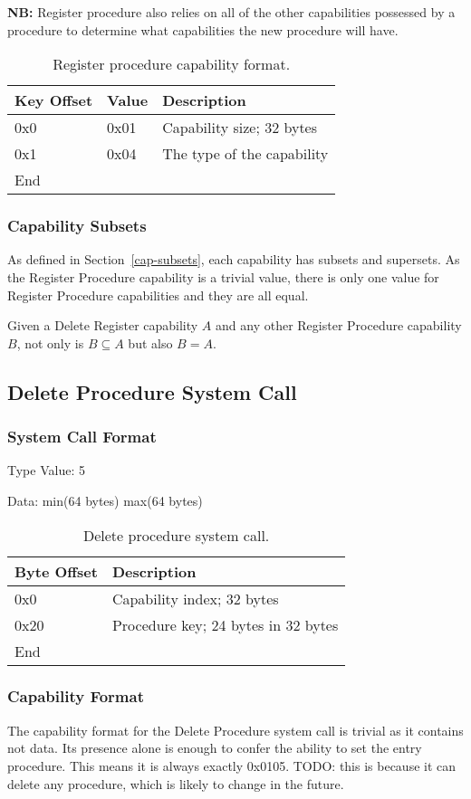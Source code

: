 \documentclass[english,a4paper]{article}
\let\oldparagraph\subsubsection
\renewcommand{\subsubsection}[1]{\oldparagraph{#1}\mbox{}}
\begin{document}
\textbf{NB:} Register procedure also relies on all of the other capabilities
possessed by a procedure to determine what capabilities the new procedure will
have.

\begin{table}[H]
  \caption{Register procedure capability format.}
  \centering{}%
  \begin{tabular}{l|l|p{}}
    \hline
    Key Offset & Value & Description\tabularnewline
    \hline
    \hline
    0x0 & 0x01 & Capability size; 32 bytes \tabularnewline
    0x1 & 0x04 & The type of the capability \tabularnewline
    \hline
    End &  \tabularnewline
    \hline
  \end{tabular}
\end{table}

\subsubsection{Capability Subsets}
As defined in Section~\ref{cap-subsets}, each capability has subsets and
supersets. As the Register Procedure capability is a trivial value, there is
only one value for Register Procedure capabilities and they are all equal.

Given a Delete Register capability $A$ and any other Register Procedure
capability $B$, not only is $B \subseteq A$ but also $B = A$.

\subsection{Delete Procedure System Call}

\subsubsection{System Call Format}
Type Value: 5

Data: min(64 bytes) max(64 bytes)

\begin{table}[H]
  \caption{Delete procedure system call.}
  \centering{}%
  \begin{tabular}{l|p{}}
    \hline
    Byte Offset & Description\tabularnewline
    \hline
    \hline
    0x0 & Capability index; 32 bytes \tabularnewline
    0x20 & Procedure key; 24 bytes in 32 bytes \tabularnewline
    \hline
    End &  \tabularnewline
    \hline
  \end{tabular}
\end{table}

\subsubsection{Capability Format}
The capability format for the Delete Procedure system call is trivial as it
contains not data. Its presence alone is enough to confer the ability to set the
entry procedure. This means it is always exactly 0x0105. TODO: this is because
it can delete any procedure, which is likely to change in the future.
\end{document}
